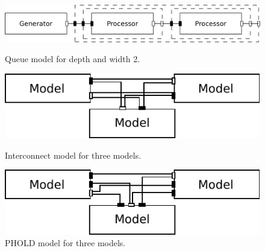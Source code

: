 \begin{figure}
	\center
	\includegraphics[width=\columnwidth]{fig/queue_model_fixed.pdf}
	\caption{Queue model for depth and width 2.}
	\label{fig:queue_model}
	
	\vspace{\betweenmodels}
	
	\includegraphics[width=\modelfraction\columnwidth]{fig/interconnect_model.pdf}
	\caption{Interconnect model for three models.}
	\label{fig:interconnect_model}
	
	\vspace{\betweenmodels}
	
	\includegraphics[width=\modelfraction\columnwidth]{fig/phold_model.pdf}
	\caption{PHOLD model for three models.}
	\label{fig:PHOLD_model}
\end{figure}
